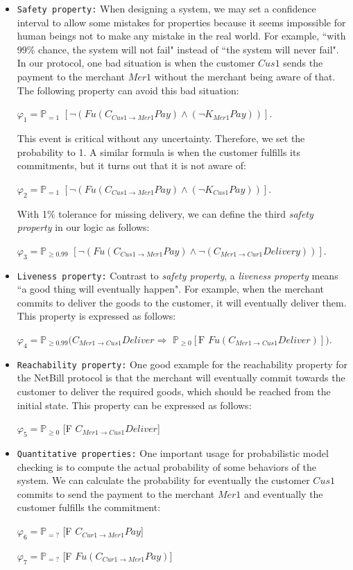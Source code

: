 \begin{itemize}
\item \texttt{Safety property:} When designing a system, we may set a confidence interval to allow some mistakes for properties because it seems impossible for human beings not to make any mistake in the real world. For example, ``with 99\% chance, the system will not fail" instead of ``the system will never fail". In our protocol, one bad situation is when the customer $Cus1$ sends the payment to the merchant $Mer1$ without the merchant being aware of that. The following property can avoid this bad situation:

$\varphi_1 = \mathbb{P}_{= 1}$ $[\neg (Fu(C_{Cus1\rightarrow Mer1}Pay)
\wedge  (\neg K_{Mer1}Pay))]$.

This event is critical without any uncertainty. Therefore, we
set the probability to 1.
A similar formula is when the customer fulfills its commitments,
but it turns out that it is not aware of:

$\varphi_2 = \mathbb{P}_{= 1}$ $[\neg (Fu(C_{Cus1\rightarrow Mer1}Pay) \wedge  (\neg K_{Cus1}Pay))]$.

With 1\% tolerance for missing delivery, we can define the third
\emph{safety  property}  in our logic as follows:

$\varphi_3 = \mathbb{P}_{\geq 0.99}$ $[\neg (Fu(C_{Cus1 \rightarrow Mer1} Pay) \wedge
\neg (C_{Mer1\rightarrow Cur1} Delivery))]$.

\item \texttt{Liveness property:} Contrast to \emph{safety property}, a \emph{liveness property } means ``a good thing will eventually happen". For example, when the merchant commits to deliver the goods to the customer, it will eventually deliver them. This property is expressed as follows:

$\varphi_4 = \mathbb{P}_{\geq 0.99}(C_{Mer1 \rightarrow Cus1} Deliver\Rightarrow$
$\mathbb{P}_{\ge 0} [\text{F } Fu(C_{Mer1 \rightarrow Cus1} Deliver)]) $.

\item \texttt{Reachability property:} One good example for the reachability property for the NetBill protocol is that the merchant will eventually commit towards the customer to deliver the required goods, which should be reached from the initial state. This property can be expressed as follows:

$\varphi_5 = \mathbb{P}_{\geq 0}$ [F $C_{Mer1 \rightarrow Cus1} Deliver$]

\item \texttt{Quantitative properties:} One important usage for probabilistic model checking is to compute the actual probability of some behaviors of the system. We can calculate the probability for eventually the customer $Cus1$ commits to send the payment to the merchant $Mer1$ and eventually the customer fulfills the commitment:

$\varphi_6 = \mathbb{P}_{=?}$ [F $C_{Cur1 \rightarrow Mer1} Pay$]

$\varphi_7 = \mathbb{P}_{=?}$ [F $Fu(C_{Cur1 \rightarrow Mer1} Pay)$]

\end{itemize}




